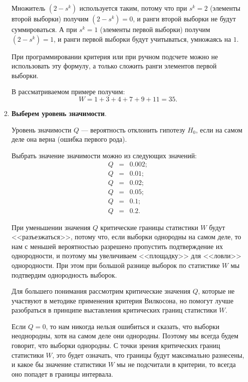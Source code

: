 \documentclass[a4paper,12pt]{article}
\begin{document}
\begin{enumerate}
Множитель $ \left( 2 - s^k\right) $ используется таким, потому что при $ s^k = 2$ (элементы второй выборки) получим $ \left( 2 - s^k\right) = 0$, и ранги второй выборки не будут суммироваться. А при $ s^k = 1$ (элементы первой выборки) получим $ \left( 2 - s^k\right) = 1$, и ранги первой выборки будут учитываться, умножаясь на $1$. 

При программировании критерия или при ручном подсчете можно не использовать эту формулу, а только сложить ранги элементов первой выборки.

В рассматриваемом примере получим:
\begin{equation*}
W=1+ 3+4+7+9+11 = 35.
\end{equation*}

\item \textbf{Выберем уровень значимости}.

Уровень значимости $ Q $ --- вероятность отклонить гипотезу $ H_0 $, если на самом деле она верна (ошибка первого рода).

Выбрать значение значимости можно из следующих значений:
\begin{eqnarray}
\label{WilcoxonW:eq:Q}
Q &=& 0.002;\\
Q &=& 0.01; \nonumber\\
Q &=& 0.02; \nonumber\\
Q &=& 0.05;\nonumber\\ 
Q &=& 0.1; \nonumber\\
Q &=& 0.2.\nonumber
\end{eqnarray}

При уменьшении значения $Q$ критические границы статистики $W$ будут <<разъезжаться>>, потому что, если выборки  однородны на самом деле, то нам с меньшей вероятностью разрешено пропустить подтверждение их однородности, и поэтому мы увеличиваем <<площадку>> для <<ловли>> однородности. При этом при большой разнице выборок по статистике $W$ мы подтвердим однородность выборок.

Для большего понимания рассмотрим критические значения $Q$, которые не участвуют в методике применения критерия Вилкосона, но помогут лучше разобраться в принципе выставления критических границ статистики $ W $. 

Если $Q=0$, то нам никогда нельзя ошибиться и сказать, что выборки неоднородны, хотя на самом деле они однородны. Поэтому мы всегда будем говорит, что выборки однородны. С точки зрения критических границ статистики  $W$, это будет означать, что границы будут максимально разнесены, и какое бы значение статистики  $W$ мы не подсчитали в критерии, то всегда оно попадет в границы интервала.


\end{enumerate}
\end{document}
